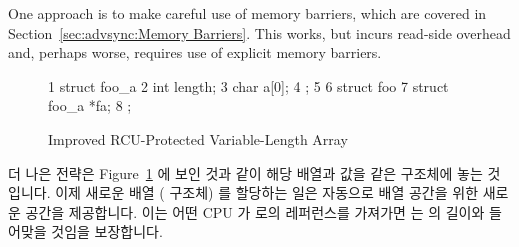 One approach is to make careful use of memory barriers, which are
covered in Section~\ref{sec:advsync:Memory Barriers}.
This works, but incurs read-side overhead and, perhaps worse, requires
use of explicit memory barriers.
\fi

\begin{figure}[tbp]
{ \scriptsize
\begin{verbbox}
 1 struct foo_a {
 2   int length;
 3   char a[0];
 4 };
 5 
 6 struct foo {
 7   struct foo_a *fa;
 8 };
\end{verbbox}
}
\centering
\theverbbox
\caption{Improved RCU-Protected Variable-Length Array}
\label{fig:together:Improved RCU-Protected Variable-Length Array}
\end{figure}

더 나은 전략은
Figure~\ref{fig:together:Improved RCU-Protected Variable-Length Array}
에 보인 것과 같이 해당 배열과 값을 같은 구조체에 놓는 것입니다.
이제 새로운 배열 ( 구조체) 를 할당하는 일은 자동으로 배열 공간을 위한
새로운 공간을 제공합니다.
이는 어떤 CPU 가  로의 레퍼런스를 가져가면  는 
의 길이와 들어맞을 것임을 보장합니다.
\iffalse

A better approach is to put the value and the array into the same structure,
as shown in
Figure~\ref{fig:together:Improved RCU-Protected Variable-Length Array}.
Allocating a new array (\co{foo_a} structure) then automatically provides
a new place for the array length.
This means that if any CPU picks up a reference to \co{->fa}, it is
guaranteed that the \co{->length} will match the \co{->a[]}
length~\cite{Arcangeli03}.
\fi

